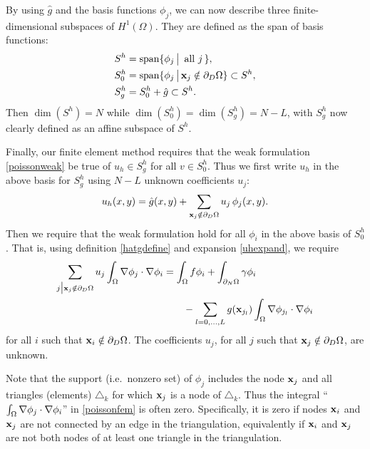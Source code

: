 By using $\hat g$ and the basis functions $\phi_j$, we can now describe three finite-dimensional subspaces of $H^1(\Omega)$.  They are defined as the span of basis functions:
\begin{align*}
S^h &= \operatorname{span}\{\phi_j \,\big|\, \text{ all } j\,\}, \\
S_0^h &= \operatorname{span}\{\phi_j \,\big|\, \mathbf{x}_j \notin \partial_D \Omega\} \subset S^h, \\
S_g^h &= S_0^h + \hat g \subset S^h.
\end{align*}
Then $\dim(S^h)=N$ while $\dim(S_0^h)=\dim(S_g^h)=N-L$, with $S_g^h$ now clearly defined as an affine subspace of $S^h$.

Finally, our finite element method requires that the weak formulation  \eqref{poissonweak} be true of $u_h\in S_g^h$ for all $v\in S_0^h$.  Thus we first write $u_h$ in the above basis for $S_g^h$ using $N-L$ unknown coefficients $u_j$:
\begin{equation}
u_h(x,y) = \hat g(x,y) + \sum_{\mathbf{x}_j \notin \partial_D \Omega} u_j\, \phi_j(x,y). \label{uhexpand}
\end{equation}
Then we require that the weak formulation hold for all $\phi_i$ in the above basis of $S_0^h$.  That is, using definition \eqref{hatgdefine} and expansion \eqref{uhexpand}, we require
\begin{align}
\sum_{j\big|\mathbf{x}_j \notin \partial_D \Omega} u_j \int_\Omega \nabla \phi_j \cdot \nabla \phi_i &= \int_\Omega f \phi_i + \int_{\partial_N\Omega} \gamma \phi_i \label{poissonfem} \\
&\qquad - \sum_{l=0,\dots,L} g(\mathbf{x}_{j_l})  \int_\Omega \nabla \phi_{j_l} \cdot \nabla \phi_i \notag
\end{align}
for all $i$ such that $\mathbf{x}_i \notin \partial_D \Omega$.  The coefficients $u_j$, for all $j$ such that $\mathbf{x}_j \notin \partial_D \Omega$, are unknown.

Note that the support (i.e.~nonzero set) of $\phi_j$ includes the node $\mathbf{x}_j$ and all triangles (elements) $\triangle_k$ for which $\mathbf{x}_j$ is a node of $\triangle_k$.  Thus the integral ``$\int_\Omega \nabla \phi_j \cdot \nabla \phi_i$'' in \eqref{poissonfem} is often zero.  Specifically, it is zero if nodes $\mathbf{x}_i$ and $\mathbf{x}_j$ are not connected by an edge in the triangulation, equivalently if $\mathbf{x}_i$ and $\mathbf{x}_j$ are not both nodes of at least one triangle in the triangulation.


